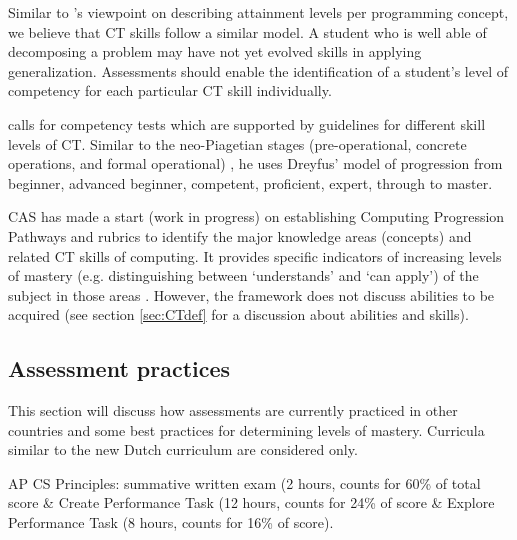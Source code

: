 Similar to 's viewpoint on describing attainment levels per programming concept, we believe that CT skills follow a similar model. A student who is well able of decomposing a problem may have not yet evolved skills in applying generalization. Assessments should enable the identification of a student's level of competency for each particular CT skill individually.


 calls for competency tests which are supported by guidelines for different skill levels of CT. Similar to the neo-Piagetian stages (pre-operational, concrete operations, and formal operational) \cite{szabo2014neo}, he uses Dreyfus' model of progression from beginner, advanced beginner, competent, proficient, expert, through to master.

CAS has made a start (work in progress) on establishing Computing Progression Pathways and rubrics \cite{Dorling2014CTprogressions} to identify the major knowledge areas (concepts) and related CT skills of computing. It provides specific indicators of increasing levels of mastery (e.g. distinguishing between ‘understands’ and ‘can apply’) of the subject in those areas \cite{Giordano2015}. However, the framework does not discuss abilities to be acquired \cite{denning2017remaining} (see section \ref{sec:CTdef} for a discussion about abilities and skills).






 





\subsection{Assessment practices}
This section will discuss how assessments are currently practiced in other countries and some best practices for determining levels of mastery. Curricula similar to the new Dutch curriculum are considered only.



AP CS Principles: summative written exam (2 hours, counts for 60\% of total score \& Create Performance Task (12 hours, counts for 24\% of score \& Explore Performance Task (8 hours, counts for 16\% of score).


